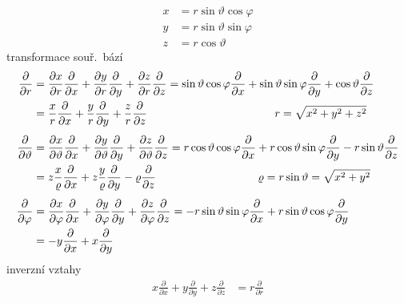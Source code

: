 \begin{priklad}
\begin{align*}
  x &= r\sin\vartheta\cos\varphi \\
  y &= r\sin\vartheta\sin\varphi \\
  z &= r\cos\vartheta
\end{align*}
transformace souř.\ bází
\begin{align*}
  \frac{\partial}{\partial r} &= \frac{\partial x}{\partial r}\frac{\partial}{\partial x} + \frac{\partial y}{\partial r}\frac{\partial}{\partial y} + \frac{\partial z}{\partial r}\frac{\partial}{\partial z}
   = \sin\vartheta\cos\varphi\frac{\partial}{\partial x} + \sin\vartheta\sin\varphi\frac{\partial}{\partial y} + \cos\vartheta\frac{\partial}{\partial z} \\
  &= \frac{x}{r}\frac{\partial}{\partial x} + \frac{y}{r}\frac{\partial}{\partial y} + \frac{z}{r}\frac{\partial}{\partial z}
   \hspace{4cm} r = \sqrt{x^2+y^2+z^2} \\[4pt]
  \frac{\partial}{\partial\vartheta} &= \frac{\partial x}{\partial\vartheta}\frac{\partial}{\partial x} + \frac{\partial y}{\partial\vartheta}\frac{\partial}{\partial y} + \frac{\partial z}{\partial\vartheta}\frac{\partial}{\partial z}
   = r\cos\vartheta\cos\varphi\frac{\partial}{\partial x} + r\cos\vartheta\sin\varphi\frac{\partial}{\partial y} - r\sin\vartheta\frac{\partial}{\partial z} \\
  &= z\frac{x}{\varrho}\frac{\partial}{\partial x} + z\frac{y}{\varrho}\frac{\partial}{\partial y} - \varrho\frac{\partial}{\partial z}
   \hspace{3.2cm} \varrho = r\sin\vartheta = \sqrt{x^2+y^2} \\[4pt]
  \frac{\partial}{\partial\varphi} &= \frac{\partial x}{\partial\varphi}\frac{\partial}{\partial x} + \frac{\partial y}{\partial\varphi}\frac{\partial}{\partial y} + \frac{\partial z}{\partial\varphi}\frac{\partial}{\partial z}
   = -r\sin\vartheta\sin\varphi\frac{\partial}{\partial x} + r\sin\vartheta\cos\varphi\frac{\partial}{\partial y} \\
  &= -y\frac{\partial}{\partial x} + x\frac{\partial}{\partial y}
\end{align*}
inverzní vztahy
\begin{align}
  x\frac{\partial}{\partial x} + y\frac{\partial}{\partial y} + z\frac{\partial}{\partial z} &= r\frac{\partial}{\partial r} \tag{1}\\

\end{align}
\end{priklad}
